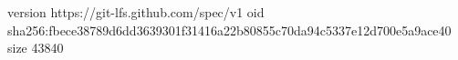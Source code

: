 version https://git-lfs.github.com/spec/v1
oid sha256:fbece38789d6dd3639301f31416a22b80855c70da94c5337e12d700e5a9ace40
size 43840
